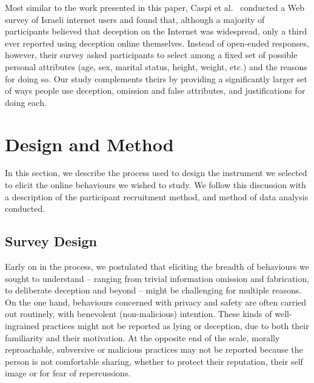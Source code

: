 \documentclass{sig-alternate}
\newcommand{\todo}[1]{\textbf{\color{red}TODO: #1}}
\begin{document}
Most similar to the work presented in this paper, Caspi et al.~\cite{caspi2006online} conducted a Web survey of Israeli internet users and found that, although a majority of participants believed that deception on the Internet was widespread, only a third ever reported using deception online themselves.  Instead of open-ended responses, however, their survey asked participants to select among a fixed set of possible personal attributes (age, sex, marital status, height, weight, etc.) and the reasons for doing so. Our study complements theirs by providing a significantly larger set of ways people use deception, omission and false attributes, and justifications for doing each. %

\section{Design and Method}

In this section, we describe the process used to design the instrument we selected to elicit the online behaviours we wished to study.  We follow this discussion with a description of the participant recruitment method, and method of data analysis conducted.

\subsection{Survey Design}

Early on in the process, we postulated that eliciting the breadth of behaviours we sought to understand -- ranging from trivial information omission and fabrication, to deliberate deception and beyond -- might be challenging for multiple reasons. On the one hand, behaviours concerned with privacy and safety are often carried out routinely, with benevolent (non-malicious) intention. These kinds of well-ingrained practices might not be reported as lying or deception, due to both their familiarity and their motivation. At the opposite end of the scale, morally reproachable, subversive or malicious practices may not be reported because the person is not comfortable sharing, whether to protect their reputation, their self image or for fear of repercussions.
\end{document}
